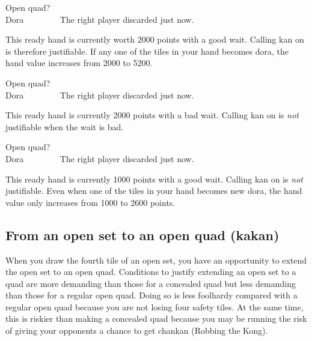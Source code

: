 \bigskip
\begin{itembox}[r]{Open quad?}
\bp
{}\zhong\zhong\zhong~~~\\
\hfill\footnotesize{{\jap Dora}~~~~~~~~}
\ep
\vspace{-20pt}The right player discarded {\LARGE\zhong} just now.
\end{itembox}
\noindent This ready hand is currently worth 2000 points with a good wait. Calling {\jap kan} on {\LARGE\zhong} is therefore justifiable. If any one of the tiles in your hand becomes {\jap dora}, the hand value increases from 2000 to 5200. 

\bigskip
\begin{itembox}[r]{Open quad?}
\bp
{}\zhong\zhong\zhong~~~\\
\hfill\footnotesize{{\jap Dora}~~~~~~~~}
\ep
\vspace{-20pt}The right player discarded {\LARGE\zhong} just now.
\end{itembox}
\noindent This ready hand is currently 2000 points with a bad wait. Calling {\jap kan} on {\LARGE\zhong} is \emph{not} justifiable when the wait is bad.

\bigskip
\begin{itembox}[r]{Open quad?}
\bp
{}\zhong\zhong\zhong~~~\\
\hfill\footnotesize{{\jap Dora}~~~~~~~~}
\ep
\vspace{-20pt}The right player discarded {\LARGE\zhong} just now.
\end{itembox}
\noindent This ready hand is currently 1000 points with a good wait. Calling {\jap kan} on {\LARGE\zhong} is \emph{not} justifiable. Even when one of the tiles in your hand becomes new {\jap dora}, the hand value only increases from 1000 to 2600 points. 

\subsection{From an open set to an open quad ({\jap kakan})}
When you draw the fourth tile of an open set, you have an opportunity to extend the open set to an open quad. Conditions to justify extending an open set to a quad are more demanding than those for a concealed quad but less demanding than those for a regular open quad. 
Doing so is less foolhardy compared with a regular open quad because you are not losing four safety tiles. At the same time, this is riskier than making a concealed quad because you may be running the risk of giving your opponents a chance to get {\jap chankan} (Robbing the Kong). 


